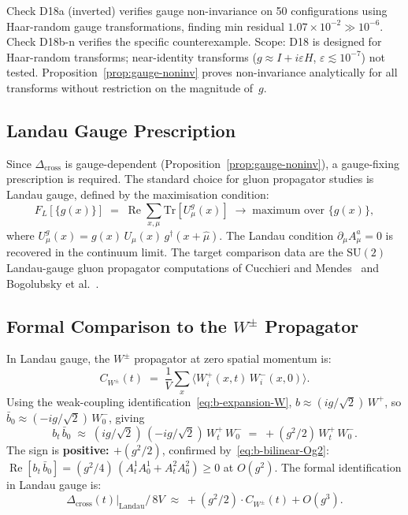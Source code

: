 \documentclass[12pt]{article}
\numberwithin{equation}{section}
\theoremstyle{plain}
\theoremstyle{definition}
\theoremstyle{remark}
\newcommand{\su}{\mathrm{SU}}              %
\newcommand{\tr}{\mathrm{Tr}}              %
\newcommand{\Dcross}{\Delta_{\mathrm{cross}}}  %
\begin{document}
	Check D18a (inverted) verifies gauge non-invariance on 50
	configurations using Haar-random gauge transformations, finding
	min residual $1.07\times 10^{-2}\gg 10^{-6}$.  Check D18b-n verifies
	the specific counterexample.  Scope: D18 is designed for Haar-random
	transforms; near-identity transforms
	($g \approx I + i\varepsilon H$, $\varepsilon \lesssim 10^{-7}$) not
	tested.  Proposition~\ref{prop:gauge-noninv} proves non-invariance
	analytically for all transforms without restriction on the magnitude
	of~$g$.
	
	\subsection{Landau Gauge Prescription}
	\label{sec:landau-presc}
	
	Since $\Dcross$ is gauge-dependent
	(Proposition~\ref{prop:gauge-noninv}), a gauge-fixing prescription
	is required.  The standard choice for gluon propagator studies is
	Landau gauge, defined by the maximisation condition:
	\begin{equation}
		F_{L}[\{g(x)\}]
		\;=\; \operatorname{Re}\sum_{x,\mu}
		\tr[U^{g}_{\mu}(x)]
		\;\longrightarrow\; \text{maximum over } \{g(x)\},
		\label{eq:Landau-gauge}
	\end{equation}
	where $U^{g}_{\mu}(x) = g(x)\,U_{\mu}(x)\,g^{\dagger}(x+\hat{\mu})$.
	The Landau condition $\partial_{\mu} A^{a}_{\mu} = 0$ is recovered in
	the continuum limit.  The target comparison data are the $\su(2)$
	Landau-gauge gluon propagator computations of Cucchieri and
	Mendes~\cite{CucchieriMendes2008} and Bogolubsky et
	al.~\cite{Bogolubsky}.
	
	\subsection{Formal Comparison to the
		\texorpdfstring{$W^{\pm}$}{W±} Propagator}
	\label{sec:Wpm-compare}
	
	In Landau gauge, the $W^{\pm}$ propagator at zero spatial momentum
	is:
	\[
	C_{W^{\pm}}(t)
	\;=\; \frac{1}{V}\sum_{x}
	\bigl\langle W^{+}_{i}(x,t)\,W^{-}_{i}(x,0)\bigr\rangle.
	\]
	Using the weak-coupling identification~\eqref{eq:b-expansion-W},
	$b \approx (ig/\sqrt{2})\,W^{+}$, so
	$\bar{b}_{0} \approx (-ig/\sqrt{2})\,W^{-}_{0}$, giving
	\[
	b_{t}\,\bar{b}_{0}
	\;\approx\; (ig/\sqrt{2})\,(-ig/\sqrt{2})\,W^{+}_{t}\,W^{-}_{0}
	\;=\; +(g^{2}/2)\,W^{+}_{t}\,W^{-}_{0}.
	\]
	The sign is \textbf{positive: $+(g^{2}/2)$}, confirmed
	by~\eqref{eq:b-bilinear-Og2}:
	$\operatorname{Re}[b_t\,\bar{b}_0]
	= (g^2/4)\,(A^{1}_t A^{1}_0 + A^{2}_t A^{2}_0) \geq 0$ at $O(g^2)$.
	The formal identification in Landau gauge is:
	\begin{equation}
		\Dcross(t)\big|_{\mathrm{Landau}}\big/\,8V
		\;\approx\; +(g^{2}/2)\cdot C_{W^{\pm}}(t) + O(g^{3}).
		\label{eq:Dcross-Landau}
	\end{equation}
	
\end{document}
